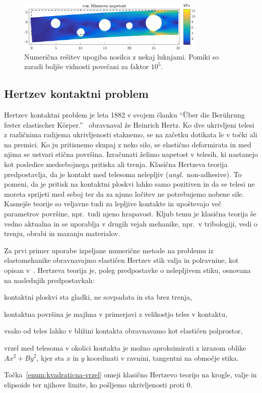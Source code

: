 \documentclass[12pt,a4paper,twoside]{article}
\newenvironment{enumerate*}{\vspace{-1.5\parskip}\begin{enumerate}\setlength{\itemsep}{0pt}\setlength{\parskip}{2pt}}{\end{enumerate}\vspace{-1\parskip}}
\theoremstyle{definition} %
\theoremstyle{plain} %
\numberwithin{equation}{section}
\newcommand{\ang}[1]{(\hspace{-1.5px}\textit{angl.}\ #1)}
\begin{document}
\begin{figure}[h]
  \centering
  \includegraphics[width=0.8\textwidth]{images/cantilever_beam_with_holes.png}
  \caption[Numerična rešitev upogiba nosilca z nekaj luknjami.]{Numerična
  rešitev upogiba nosilca z nekaj luknjami. Pomiki so zaradi boljše vidnosti
  povečani za faktor $10^5$.}
  \label{fig:cantilever-beam-with-holes}
\end{figure}

\subsection{Hertzev kontaktni problem}
\label{sec:hertz}
Hertzev kontaktni problem je leta 1882 v svojem članku ``{\"U}ber die Ber{\"u}hrung fester
elastischer K{\"o}rper.''~\cite{hertz1882beruhrung} obravnaval že Heinrich Hertz. Ko dve ukrivljeni
telesi z različnima radijema ukrivljenosti staknemo, se na začetku dotikata le v točki ali na
premici. Ko ju pritisnemo skupaj z neko silo, se elastično deformirata in med njima se ustvari
stična površina. Izračunati želimo napetost v telesih, ki nastanejo kot posledice medsebojnega
pritiska ali trenja. Klasična Hertzeva teorija predpostavlja, da je kontakt med telesoma nelepljiv
\ang{non-adhesive}. To pomeni, da je pritisk na kontaktni ploskvi lahko samo pozitiven in da se
telesi ne moreta sprijeti med seboj ter da za njuno ločitev ne potrebujemo nobene sile. Kasnejše
teorije so veljavne tudi za lepljive kontakte in upoštevajo več parametrov površine, npr.~tudi njeno
hrapavost. Kljub temu je klasična teorija še vedno aktualna in se uporablja v drugih vejah mehanike,
npr.~v tribologiji, vedi o trenju, obrabi in mazanju materialov.

Za prvi primer uporabe izpeljane numerične metode na problemu iz elastomehanike obravnavajmo
elastičen Hertzev stik valja in polravnine, kot opisan v~\cite[str.\ 122, poglavje 3.2]{williams2001contact}.
Hertzeva teorija je, poleg predpostavke o nelepljivem stiku, osnovana na naslednjih predpostavkah:
\begin{enumerate*}
  \item kontaktni ploskvi sta gladki, ne sovpadata in sta brez trenja,
  \item kontaktna površina je majhna v primerjavi z velikostjo teles v kontaktu,
  \item vsako od teles lahko v bližini kontakta obravnavamo kot elastičen polprostor,
  \item vrzel med telesoma v okolici kontakta je možno aproksimirati z izrazom oblike $Ax^2 + By^2$,
    kjer sta $x$ in $y$ koordinati v ravnini, tangentni na območje stika.
    \label{enum:kvadraticna-vrzel}
\end{enumerate*}
Točka~\ref{enum:kvadraticna-vrzel} omeji klasično Hertzevo teorijo na krogle, valje in elipsoide ter
njihove limite, ko pošljemo ukrivljenosti proti 0.
\end{document}
